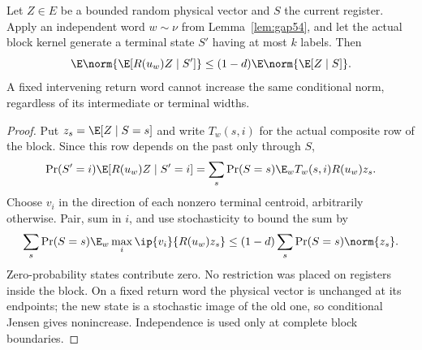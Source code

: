 \begin{lemma}\label{lem:centroid54}
Let $Z\in E$ be a bounded random physical vector and $S$ the current register. Apply an independent word $w\sim\nu$ from Lemma~\ref{lem:gap54}, and let the actual block kernel generate a terminal state $S'$ having at most $k$ labels. Then
\begin{equation}\label{eq:centroid54}
 \E\norm{\E[R(u_w)Z\mid S']}\le(1-d)\E\norm{\E[Z\mid S]}.
\end{equation}
A fixed intervening return word cannot increase the same conditional norm, regardless of its intermediate or terminal widths.
\end{lemma}
\begin{proof}
Put $z_s=\E[Z\mid S=s]$ and write $T_w(s,i)$ for the actual composite row of the block. Since this row depends on the past only through $S$,
\[
 \Pr(S'=i)\E[R(u_w)Z\mid S'=i]
 =\sum_s\Pr(S=s)\E_w T_w(s,i)R(u_w)z_s.
\]
Choose $v_i$ in the direction of each nonzero terminal centroid, arbitrarily otherwise. Pair, sum in $i$, and use stochasticity to bound the sum by
\[
 \sum_s\Pr(S=s)\E_w\max_i\ip{v_i}{R(u_w)z_s}
 \le(1-d)\sum_s\Pr(S=s)\norm{z_s}.
\]
Zero-probability states contribute zero. No restriction was placed on registers inside the block. On a fixed return word the physical vector is unchanged at its endpoints; the new state is a stochastic image of the old one, so conditional Jensen gives nonincrease. Independence is used only at complete block boundaries.
\end{proof}
